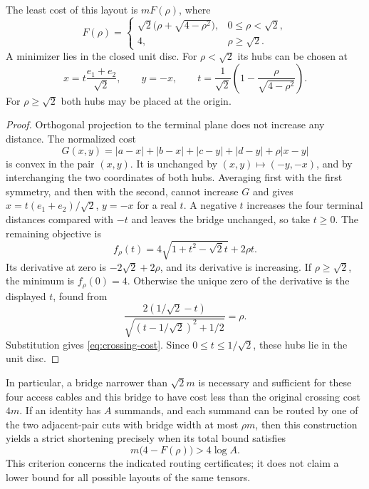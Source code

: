 \begin{proposition}\label{prop:optimal-crossing-hubs}
The least cost of this layout is $mF(\rho)$, where
\begin{equation}\label{eq:crossing-cost}
 F(\rho)=
 \begin{cases}
 \sqrt2\bigl(\rho+\sqrt{4-\rho^2}\bigr),&0\leq\rho<\sqrt2,\\
 4,&\rho\geq\sqrt2.
 \end{cases}
\end{equation}
A minimizer lies in the closed unit disc. For $\rho<\sqrt2$ its hubs can be chosen at
\[
 x=t\frac{e_1+e_2}{\sqrt2},\qquad y=-x,\qquad
 t=\frac{1}{\sqrt2}\left(1-\frac{\rho}{\sqrt{4-\rho^2}}\right).
\]
For $\rho\geq\sqrt2$ both hubs may be placed at the origin.
\end{proposition}
\begin{proof}
Orthogonal projection to the terminal plane does not increase any distance. The normalized cost
\[
 G(x,y)=|a-x|+|b-x|+|c-y|+|d-y|+\rho|x-y|
\]
is convex in the pair $(x,y)$. It is unchanged by $(x,y)\mapsto(-y,-x)$, and by interchanging the two coordinates of both hubs. Averaging first with the first symmetry, and then with the second, cannot increase $G$ and gives $x=t(e_1+e_2)/\sqrt2$, $y=-x$ for a real $t$. A negative $t$ increases the four terminal distances compared with $-t$ and leaves the bridge unchanged, so take $t\geq0$. The remaining objective is
\[
 f_\rho(t)=4\sqrt{1+t^2-\sqrt2t}+2\rho t.
\]
Its derivative at zero is $-2\sqrt2+2\rho$, and its derivative is increasing. If $\rho\geq\sqrt2$, the minimum is $f_\rho(0)=4$. Otherwise the unique zero of the derivative is the displayed $t$, found from
\[
 \frac{2(1/\sqrt2-t)}{\sqrt{(t-1/\sqrt2)^2+1/2}}=\rho.
\]
Substitution gives \eqref{eq:crossing-cost}. Since $0\leq t\leq1/\sqrt2$, these hubs lie in the unit disc.
\end{proof}

In particular, a bridge narrower than $\sqrt2m$ is necessary and sufficient for these four access cables and this bridge to have cost less than the original crossing cost $4m$. If an identity has $A$ summands, and each summand can be routed by one of the two adjacent-pair cuts with bridge width at most $\rho m$, then this construction yields a strict shortening precisely when its total bound satisfies
\begin{equation}\label{eq:crossing-selector-test}
 m\bigl(4-F(\rho)\bigr)>4\log A.
\end{equation}
This criterion concerns the indicated routing certificates; it does not claim a lower bound for all possible layouts of the same tensors.

